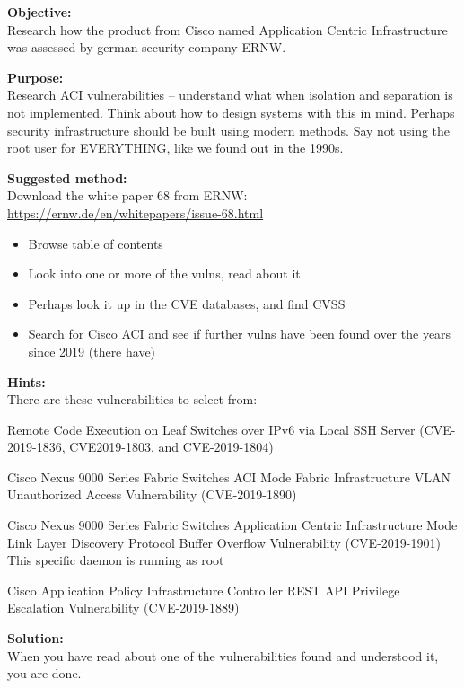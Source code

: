 \documentclass[a4paper,11pt,notitlepage]{report}
\begin{document}
{\bf Objective:}\\
Research how the product from Cisco named Application Centric Infrastructure was assessed by german security company ERNW.

{\bf Purpose:}\\
Research ACI vulnerabilities -- understand what when isolation and separation is not implemented. Think about how to design systems with this in mind. Perhaps security infrastructure should be built using modern methods. Say not using the root user for EVERYTHING, like we found out in the 1990s.

{\bf Suggested method:}\\
Download the white paper 68 from ERNW:\\
\url{https://ernw.de/en/whitepapers/issue-68.html}

\begin{itemize}
\item Browse table of contents
\item Look into one or more of the vulns, read about it
\item Perhaps look it up in the CVE databases, and find CVSS
\item Search for Cisco ACI and see if further vulns have been found over the years since 2019 (there have)
\end{itemize}

{\bf Hints:}\\
There are these vulnerabilities to select from:
\begin{list2}
\item Remote Code Execution on Leaf Switches over IPv6 via Local SSH Server (CVE-2019-1836, CVE2019-1803, and CVE-2019-1804)
\item Cisco Nexus 9000 Series Fabric Switches ACI Mode Fabric Infrastructure VLAN Unauthorized
  Access Vulnerability (CVE-2019-1890)
\item Cisco Nexus 9000 Series Fabric Switches Application Centric Infrastructure Mode Link Layer
  Discovery Protocol Buffer Overflow Vulnerability (CVE-2019-1901)\\
  This specific daemon is running as root
\item Cisco Application Policy Infrastructure Controller REST API Privilege Escalation Vulnerability (CVE-2019-1889)
\end{list2}


{\bf Solution:}\\
When you have read about one of the vulnerabilities found and understood it, you are done.
\end{document}
